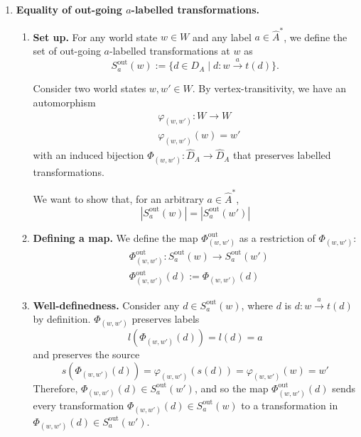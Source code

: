 \begin{proofE}
\begin{enumerate}
    \item \textbf{Equality of out-going $a$-labelled transformations.}
    \begin{enumerate}
        \item \textbf{Set up.}
        For any world state $w \in W$ and any label $a \in \hat{A}^{*}$, we define the set of out-going $a$-labelled transformations at $w$ as
        \begin{equation}
            S_{a}^{\text{out}}(w) := \{ d \in D_{A} \mid d: w \xrightarrow{a} t(d) \}.
        \end{equation}

        Consider two world states $w, w' \in W$.
        By vertex-transitivity, we have an automorphism
        \begin{equation}
        \begin{aligned}
            & \varphi_{(w,w')}: W \to W \\
            & \varphi_{(w,w')}(w) = w'
        \end{aligned}
        \end{equation}
        with an induced bijection $\Phi_{(w, w')}: \hat{D}_{A} \to \hat{D}_{A}$ that preserves labelled transformations.

        We want to show that, for an arbitrary $a \in \hat{A}^{*}$,
        \begin{equation}
            |S_{a}^{\text{out}}(w)| = |S_{a}^{\text{out}}(w')|
        \end{equation}

        \item \textbf{Defining a map.}
        We define the map $\Phi_{(w, w')}^{\text{out}}$ as a restriction of $\Phi_{(w, w')}$:
        \begin{equation}
        \begin{aligned}
            & \Phi_{(w, w')}^{\text{out}}: S_{a}^{\text{out}}(w) \to S_{a}^{\text{out}}(w') \\
            & \Phi_{(w, w')}^{\text{out}}(d) := \Phi_{(w, w')}(d)
        \end{aligned}
        \end{equation}

        \item \textbf{Well-definedness.}
        Consider any $d \in S_{a}^{\text{out}}(w)$, where $d$ is $d: w \xrightarrow{a} t(d)$ by definition.
        $\Phi_{(w, w')}$ preserves labels
        \begin{equation}
            l(\Phi_{(w, w')}(d)) = l(d) = a
        \end{equation}
        and preserves the source
        \begin{equation}
            s(\Phi_{(w, w')}(d)) = \varphi_{(w, w')}(s(d)) = \varphi_{(w, w')}(w) = w'
        \end{equation}
        Therefore, $\Phi_{(w, w')}(d) \in S_{a}^{\text{out}}(w')$, and so the map $\Phi_{(w, w')}^{\text{out}}(d)$ sends every transformation $\Phi_{(w, w')}(d) \in S_{a}^{\text{out}}(w)$ to a transformation in $\Phi_{(w, w')}(d) \in S_{a}^{\text{out}}(w')$.


\end{enumerate}
\end{enumerate}
\end{proofE}
